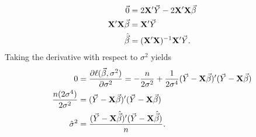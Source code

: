 \begin{Theorem}{}{}
\begin{align*}
        \vec{0}                          & =2\mathbf{X}'\vec{Y}-2 \mathbf{X}'\mathbf{X}\vec{\beta}                                                                             \\
        \mathbf{X}'\mathbf{X}\vec{\beta} & =\mathbf{X}'\vec{Y}                                                                                                                    \\
        \hat{\vec{\beta}}                & =(\mathbf{X}'\mathbf{X})^{-1}\mathbf{X}'\vec{Y}.
    \end{align*}
    Taking the derivative with respect to $ \sigma^2 $ yields
    \begin{align*}
        0                              & =\pdv{\ell(\vec{\beta},\sigma^2)}{\sigma^2}=-\frac{n}{2\sigma^2}+\frac{1}{2\sigma^4}(\vec{Y}-\mathbf{X}\vec{\beta})'(\vec{Y}-\mathbf{X}\vec{\beta}) \\
        \frac{n(2\sigma^4)}{2\sigma^2} & =(\vec{Y}-\mathbf{X}\vec{\beta})'(\vec{Y}-\mathbf{X}\vec{\beta})                                                                                       \\
        \hat{\sigma}^2                 & =\frac{(\vec{Y}-\mathbf{X}\hat{\vec{\beta}})'(\vec{Y}-\mathbf{X}\hat{\vec{\beta}})}{n}.
    \end{align*}
\end{Theorem}
